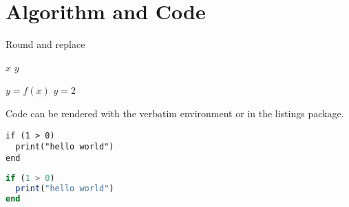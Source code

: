 \section{Algorithm and Code}
\begin{algorithm}[h]
\caption{Round and replace}\label{alg:21}
\begin{algorithmic}[1] %
	\Require $x$
	\Ensure $y$

	\State $y = f(x)$
		\State $y = 2$
	\EndIf

\end{algorithmic}
\end{algorithm}


Code can be rendered with the verbatim environment or in the listings package.

\begin{verbatim}
if (1 > 0)
  print("hello world")
end
\end{verbatim}

\begin{lstlisting}[language=Octave]
if (1 > 0)
  print("hello world")
end
\end{lstlisting}
